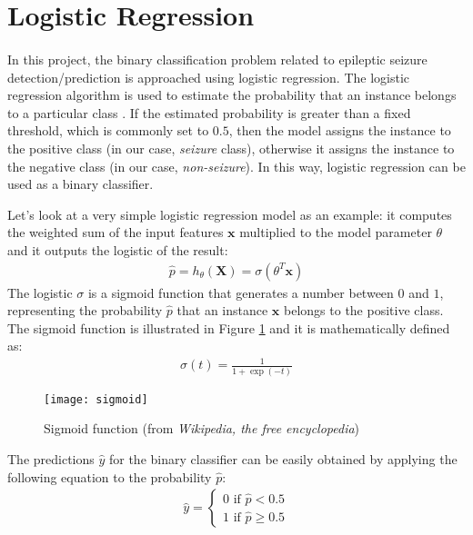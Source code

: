 
\section{Logistic Regression} \label{sec: logistic_regression}
\paragraph{} In this project, the binary classification problem related to epileptic seizure detection/prediction is approached using logistic regression. The logistic regression algorithm is used to estimate the probability that an instance belongs to a particular class \cite{OReilly:handsonML}. If the estimated probability is greater than a fixed threshold, which is commonly set to $0.5$, then the model assigns the instance to the positive class (in our case, \textit{seizure} class), otherwise it assigns the instance to the negative class (in our case, \textit{non-seizure}). In this way, logistic regression can be used as a binary classifier.

Let's look at a very simple logistic regression model as an example: it computes the weighted sum of the input features $\mathbf{x}$ multiplied to the model parameter $\theta$ and it outputs the logistic of the result:
\begin{align}
    \hat{p} = h_{\theta}(\mathbf{X}) = \sigma\left(\theta^T \mathbf{x}\right)
\end{align}
The logistic $\sigma$ is a sigmoid function that generates a number between $0$ and $1$, representing the probability $\hat{p}$ that an instance $\mathbf{x}$ belongs to the positive class. The sigmoid function is illustrated in Figure \ref{fig:sigmoid} and it is mathematically defined as:
\begin{align}
    \sigma(t) = \frac{1}{1 + \exp{(-t)}}
\end{align}

\begin{figure}[htbp]
    \centering
    \texttt{[image: sigmoid]}
    \caption{Sigmoid function (from \textit{Wikipedia, the free encyclopedia})}
    \label{fig:sigmoid}
\end{figure}

The predictions $\hat{y}$ for the binary classifier can be easily obtained by applying the following equation to the probability $\hat{p}$:
\begin{align}
    \hat{y} = \left\{\begin{array}{l}{0 \text { if } \hat{p}<0.5} \\ {1 \text { if } \hat{p} \geq 0.5}\end{array}\right.
\end{align}

